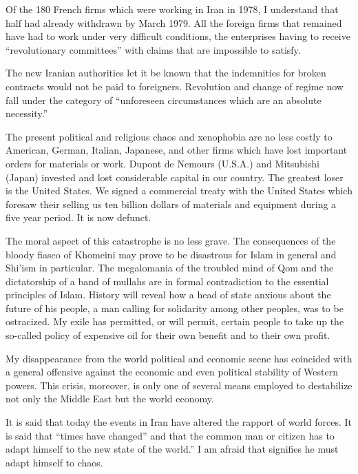 Of the 180 French firms which were working in Iran in 1978, I understand that half had already withdrawn by March 1979. All the foreign firms that remained have had to work under very difficult conditions, the enterprises having to receive “revolutionary committees” with claims that are impossible to satisfy. 

The new Iranian authorities let it be known that the indemnities for broken contracts would not be paid to foreigners. Revolution and change of regime now fall under the category of “unforeseen circumstances which are an absolute necessity.” 

The present political and religious chaos and xenophobia are no less costly to American, German, Italian, Japanese, and other firms which have lost important orders for materials or work. Dupont de Nemours (U.S.A.) and Mitsubishi (Japan) invested and lost considerable capital in our country. The greatest loser is the United States. We signed a commercial treaty with the United States which foresaw their selling us ten billion dollars of materials and equipment during a five year period. It is now defunct. 


The moral aspect of this catastrophe is no less grave. The consequences of the bloody fiasco of Khomeini may prove to be disastrous for Islam in general and Shi'ism in particular. The megalomania of the troubled mind of Qom and the dictatorship of a band of mullahs are in formal contradiction to the essential principles of Islam. History will reveal how a head of state anxious about the future of his people, a man calling for solidarity among other peoples, was to be ostracized. My exile has permitted, or will permit, certain people to take up the so-called policy of expensive oil for their own benefit and to their own profit. 

My disappearance from the world political and economic scene has coincided with a general offensive against the economic and even political stability of Western powers. This crisis, moreover, is only one of several means employed to destabilize not only the Middle East but the world economy. 

It is said that today the events in Iran have altered the rapport of world forces. It is said that “times have changed” and that the common man or citizen has to adapt himself to the new state of the world.” I am afraid that signifies he must adapt himself to chaos. 
